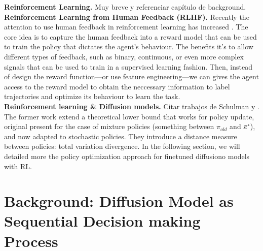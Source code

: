 \textbf{Reinforcement Learning.} Muy breve y referenciar capítulo de background.\\

\textbf{Reinforcement Learning from Human Feedback (RLHF).} Recently the attention to use human feedback in reinforcement learning has increased \cite{kaufmann2023survey}. The core idea is to capture the human feedback into a reward model that can be used to train the policy that dictates the agent's behaviour. The benefits it's to allow different types of feedback, such as binary, continuous, or even more complex signals that can be used to train in a supervised learning fashion. Then, instead of design the reward function---or use feature engineering---we can gives the agent access to the reward model to obtain the neccessary information to label trajectories and optimize its behaviour to learn the task. \\



\textbf{Reinforcement learning \& Diffusion models.} Citar trabajos de Schulman \citep{schulman2015trust} y \citep{schulman2017proximal}. The former work extend a theoretical lower bound that works for policy update, original present for the case of mixture policies (something between $\pi_{old}$ and $\pi`$), and now adapted to stochastic policies. They introduce a distance measure between policies: total variation divergence. In the following section, we will detailed more the policy optimization approach for finetuned diffusiono models with RL.\\

\section{Background: Diffusion Model as Sequential Decision making Process}

